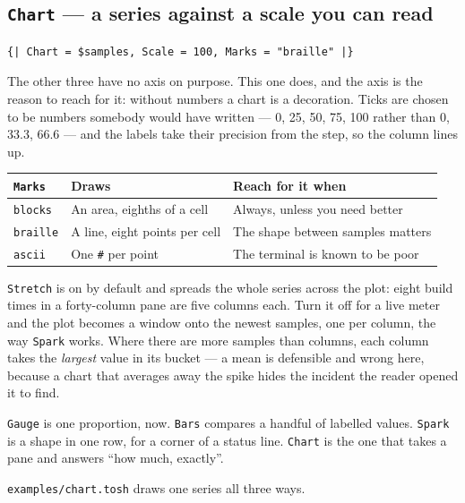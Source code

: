 \documentclass[11pt,a4paper,twoside,openany]{book}
\newcommand{\code}[1]{\texttt{\small #1}}
\begin{document}
\subsection{\texttt{Chart} --- a series against a scale you can read}

\begin{lstlisting}
{| Chart = $samples, Scale = 100, Marks = "braille" |}
\end{lstlisting}

The other three have no axis on purpose. This one does, and the axis is the reason to
reach for it: without numbers a chart is a decoration. Ticks are chosen to be numbers
somebody would have written --- 0, 25, 50, 75, 100 rather than 0, 33.3, 66.6 --- and
the labels take their precision from the step, so the column lines up.

\begin{center}
\begin{tabular}{@{}lll@{}}
\toprule
\code{Marks} & Draws & Reach for it when \\
\midrule
\code{blocks} & An area, eighths of a cell & Always, unless you need better \\
\code{braille} & A line, eight points per cell & The shape between samples matters \\
\code{ascii} & One \code{\#} per point & The terminal is known to be poor \\
\bottomrule
\end{tabular}
\end{center}

\noindent \code{Stretch} is on by default and spreads the whole series across the
plot: eight build times in a forty-column pane are five columns each. Turn it off for
a live meter and the plot becomes a window onto the newest samples, one per column,
the way \code{Spark} works. Where there are more samples than columns, each column
takes the \emph{largest} value in its bucket --- a mean is defensible and wrong here,
because a chart that averages away the spike hides the incident the reader opened it
to find.

\begin{notebox}
\code{Gauge} is one proportion, now. \code{Bars} compares a handful of labelled
values. \code{Spark} is a shape in one row, for a corner of a status line.
\code{Chart} is the one that takes a pane and answers ``how much, exactly''.
\end{notebox}

\noindent \code{examples/chart.tosh} draws one series all three ways.
\end{document}
